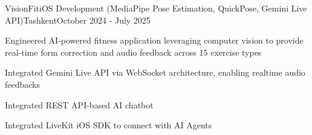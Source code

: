 \begin{resume_employer}{VisionFit}{iOS Development (MediaPipe Pose Estimation, QuickPose, Gemini Live API)}{Tashkent}{October 2024 - July 2025}
\item Engineered AI-powered fitness application leveraging computer vision to provide real-time form correction and audio feedback across 15 exercise types
\item Integrated Gemini Live API via WebSocket architecture, enabling realtime audio feedbacks
\item Integrated REST API-based AI chatbot
\item Integrated LiveKit iOS SDK to connect with AI Agents
\end{resume_employer}
